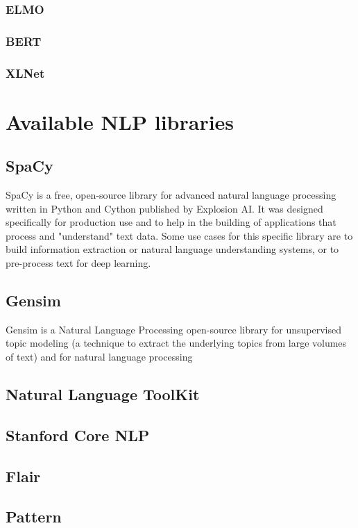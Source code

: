         \subsubsection{ELMO}
        \subsubsection{BERT}
        \subsubsection{XLNet}
        

       
\section{Available NLP libraries}


        \subsection{SpaCy}
        
        \par SpaCy is a free, open-source library for advanced natural language processing written in Python and Cython published by Explosion AI. It was designed specifically for production use and to help in the building of applications that process and "understand" text data. Some use cases for this specific library are to build information extraction or natural language understanding systems, or to pre-process text for deep learning. \cite{Spacy2017}


        \subsection{Gensim}

        \par Gensim is a Natural Language Processing open-source library for unsupervised topic modeling (a technique to extract the underlying topics from large volumes of text)  and for natural language processing


        \subsection{Natural Language ToolKit}

        \subsection{Stanford Core NLP}

        \subsection{Flair}

        \subsection{Pattern}